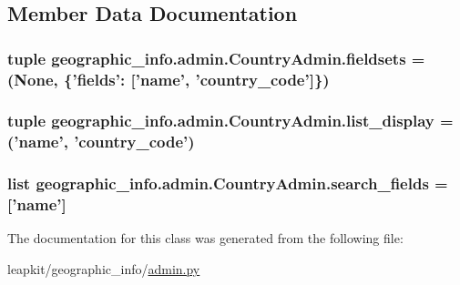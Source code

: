 \subsection{Member Data Documentation}
\hypertarget{classgeographic__info_1_1admin_1_1_country_admin_a78833b00c76c00197750aecbe012014c}{
\subsubsection[{fieldsets}]{\setlength{\rightskip}{0pt plus 5cm}tuple geographic\-\_\-info.\-admin.\-Country\-Admin.\-fieldsets = (None, \{'fields'\-: \mbox{[}'name', 'country\-\_\-code'\mbox{]}\})\hspace{0.3cm}{\ttfamily [static]}}}\label{classgeographic__info_1_1admin_1_1_country_admin_a78833b00c76c00197750aecbe012014c}
\hypertarget{classgeographic__info_1_1admin_1_1_country_admin_a17315e2e797d122568a5de87edbdd8d5}{
\subsubsection[{list\-\_\-display}]{\setlength{\rightskip}{0pt plus 5cm}tuple geographic\-\_\-info.\-admin.\-Country\-Admin.\-list\-\_\-display = ('name', 'country\-\_\-code')\hspace{0.3cm}{\ttfamily [static]}}}\label{classgeographic__info_1_1admin_1_1_country_admin_a17315e2e797d122568a5de87edbdd8d5}
\hypertarget{classgeographic__info_1_1admin_1_1_country_admin_a8b13be9b97b65db8aedf41ec07d870e6}{
\subsubsection[{search\-\_\-fields}]{\setlength{\rightskip}{0pt plus 5cm}list geographic\-\_\-info.\-admin.\-Country\-Admin.\-search\-\_\-fields = \mbox{[}'name'\mbox{]}\hspace{0.3cm}{\ttfamily [static]}}}\label{classgeographic__info_1_1admin_1_1_country_admin_a8b13be9b97b65db8aedf41ec07d870e6}


The documentation for this class was generated from the following file\-:\begin{DoxyCompactItemize}
\item 
leapkit/geographic\-\_\-info/\hyperlink{geographic__info_2admin_8py}{admin.\-py}\end{DoxyCompactItemize}
